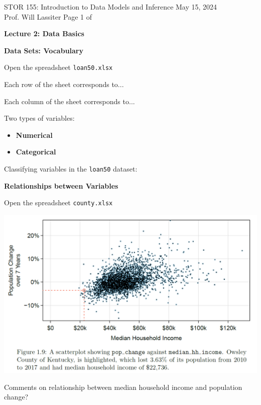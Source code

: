 \documentclass[11pt,letterpaper,twoside]{article}
\newcommand{\whatizit}{Lecture 2: Data Basics}
\begin{document}
\thispagestyle{empty} \vspace*{-0.75in}

{\bssten STOR 155: Introduction to Data Models and Inference \hfill May 15, 2024 \\
Prof. Will Lassiter  \hfill Page 1 of \pageref{totalpag}}
\vspace{10pt}
\begin{center} {{\Large \bf \whatizit}} \end{center}

{\bf Data Sets: Vocabulary} \vspace{6pt}

Open the spreadsheet {\tt loan50.xlsx}

Each row of the sheet corresponds to... \vspace{50pt}

Each column of the sheet corresponds to... \vspace{50pt}

Two types of variables:

\begin{itemize}

\item {\bf Numerical} \vspace{100pt}

\item {\bf Categorical} \vspace{100pt}

\end{itemize}

Classifying variables in the {\tt loan50} dataset: \vspace{100pt}

\newpage

{\bf Relationships between Variables} \vspace{6pt}

Open the spreadsheet {\tt county.xlsx}

\begin{center}
\includegraphics[scale=0.7]{images/scatter1.png}
\end{center}
\vspace{-10pt}
Comments on relationship between median household income and population change? \vspace{80pt}
\end{document}
